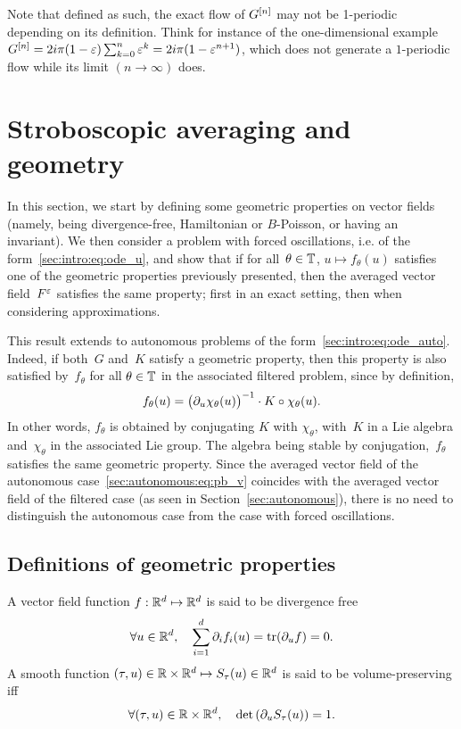 Note that defined as such, the exact flow of $G^{[n]}$ may not be
1-periodic depending on its definition. Think for instance of the
one-dimensional example $G^{[n]} = 2i\pi(1-\varepsilon) \sum_{k = 0}^{n} \varepsilon^k =
2i\pi( 1 - \varepsilon^{n+1})$, which does not generate a $1$-periodic flow
while its limit $(n \rightarrow \infty)$ does. 



\section{Stroboscopic averaging and geometry}
\label{sec:geometry}

In this section, we start by defining some geometric properties on
vector fields (namely, being divergence-free, Hamiltonian or
$B$-Poisson, or having an invariant). We then consider a problem with
forced oscillations, i.e. of the form~\eqref{sec:intro:eq:ode_u}, and
show that if for all~$\theta \in \mathbb{T}$, $u \mapsto f_\theta(u)$ satisfies
one of the geometric properties previously presented, then the averaged
vector field~$F^\varepsilon$ satisfies the same property; first in an exact
setting, then when considering approximations.

This result extends to autonomous problems of the
form~\eqref{sec:intro:eq:ode_auto}. Indeed, if both~$G$ and~$K$ satisfy
a geometric property, then this property is also satisfied by~$f_\theta$
for all $\theta \in \mathbb{T}$ in the associated filtered problem, since by
definition,
\begin{equation*}
  f_\theta(u) = \big( \partial_u \chi_{\theta}(u) \big)^{-1} 
    \cdot K \circ \chi_{\theta}(u) .
\end{equation*}
In other words, $f_\theta$ is obtained by conjugating $K$ with
$\chi_\theta$, with~$K$ in a Lie algebra and~$\chi_\theta$ in the
associated Lie group. The algebra being stable by
conjugation,~$f_\theta$ satisfies the same geometric property. 
%
Since the averaged vector field of the autonomous
case~\eqref{sec:autonomous:eq:pb_v} coincides with the averaged vector
field of the filtered case (as seen in Section~\ref{sec:autonomous}),
there is no need to distinguish the autonomous case from the case with
forced oscillations.


\subsection{Definitions of geometric properties}
\label{sec:geom:subsec:def}


\begin{definition}
  A vector field function $f:\mathbb{R}^d \mapsto \mathbb{R}^d$ is said to be
  divergence free 
  \begin{align*}
    \forall u \in \mathbb{R}^d, \quad \sum_{i=1}^d \partial_i f_i(u) = \operatorname{tr}(\partial_u f)=0.
  \end{align*}
  A smooth function $(\tau,u) \in \mathbb{R} \times \mathbb{R}^d \mapsto  S_\tau(u) \in
  \mathbb{R}^d$ is said to be volume-preserving iff
  \begin{align*}
    \forall (\tau, u) \in \mathbb{R} \times \mathbb{R}^d, 
    \quad \det\left (\partial_u S_\tau(u)\right)=1.
  \end{align*}
\end{definition}


